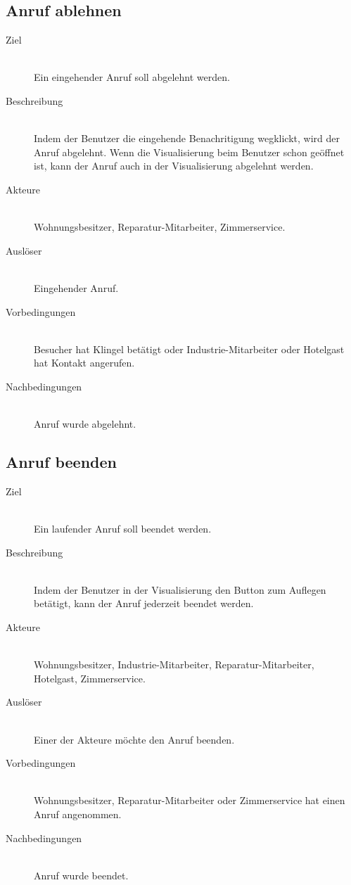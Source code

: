 \subsection{Anruf ablehnen}\label{subsec:anruf-ablehnen}
    \begin{description}
        \item[Ziel]\hfill \\
        Ein eingehender Anruf soll abgelehnt werden.
        \item[Beschreibung]\hfill \\
        Indem der Benutzer die eingehende Benachritigung wegklickt, wird der Anruf abgelehnt.
        Wenn die Visualisierung beim Benutzer schon geöffnet ist, kann der Anruf auch in der Visualisierung abgelehnt werden.
        \item[Akteure]\hfill \\
        Wohnungsbesitzer, Reparatur-Mitarbeiter, Zimmerservice.
        \item[Auslöser]\hfill \\
        Eingehender Anruf.
        \item[Vorbedingungen]\hfill \\
        Besucher hat Klingel betätigt oder Industrie-Mitarbeiter oder Hotelgast hat Kontakt angerufen.
        \item[Nachbedingungen]\hfill \\
        Anruf wurde abgelehnt.
        \end{description}

\subsection{Anruf beenden}\label{subsec:anruf-beenden}
    \begin{description}
        \item[Ziel]\hfill \\
        Ein laufender Anruf soll beendet werden.
        \item[Beschreibung]\hfill \\
        Indem der Benutzer in der Visualisierung den Button zum Auflegen betätigt, kann der Anruf jederzeit beendet werden.
        \item[Akteure]\hfill \\
        Wohnungsbesitzer, Industrie-Mitarbeiter, Reparatur-Mitarbeiter, Hotelgast, Zimmerservice.
        \item[Auslöser]\hfill \\
        Einer der Akteure möchte den Anruf beenden.
        \item[Vorbedingungen]\hfill \\
        Wohnungsbesitzer, Reparatur-Mitarbeiter oder Zimmerservice hat einen Anruf angenommen.
        \item[Nachbedingungen]\hfill \\
        Anruf wurde beendet.
        \end{description}

